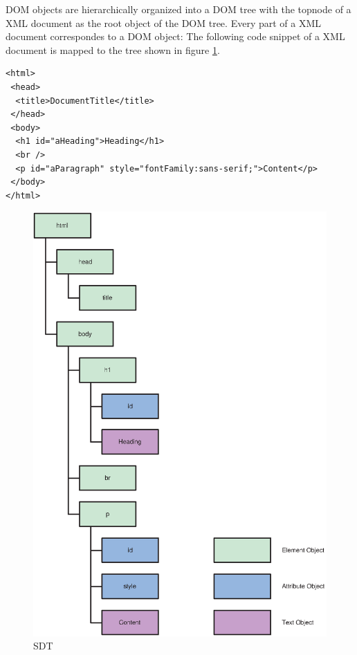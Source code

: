 
DOM objects are hierarchically organized into a DOM tree with the topnode of a XML document as the root object of the DOM tree. Every part of a XML document correspondes to a DOM object: The following code snippet of a XML document is mapped to the tree shown in figure \ref{fig:simpleDomTree}.

\begin{verbatim}
<html>
 <head>
  <title>DocumentTitle</title>
 </head>
 <body>
  <h1 id="aHeading">Heading</h1>
  <br />
  <p id="aParagraph" style="fontFamily:sans-serif;">Content</p>
 </body>
</html>
\end{verbatim}

\begin{figure}[htbp]
	\centering
		\includegraphics[scale=0.5]{simpleDomTree.eps}
	\caption{SDT}
	\label{fig:simpleDomTree}
\end{figure}

